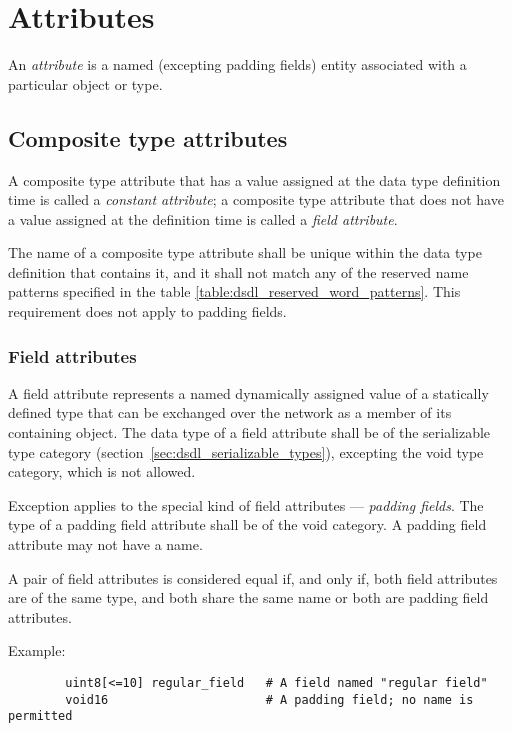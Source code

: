 \section{Attributes}\label{sec:dsdl_attributes}

An \emph{attribute} is a named (excepting padding fields) entity associated with a particular object or type.

\subsection{Composite type attributes}

A composite type attribute that has a value assigned at the data type definition time is called a
\emph{constant attribute};
a composite type attribute that does not have a value assigned at the definition time is called a
\emph{field attribute}.

The name of a composite type attribute shall be unique within the data type definition that contains it,
and it shall not match any of the reserved name patterns specified in the table
\ref{table:dsdl_reserved_word_patterns}.
This requirement does not apply to padding fields.

\subsubsection{Field attributes}

A field attribute represents a named dynamically assigned value of a statically defined type
that can be exchanged over the network as a member of its containing object.
The data type of a field attribute shall be of the serializable type category
(section~\ref{sec:dsdl_serializable_types}),
excepting the void type category, which is not allowed.

Exception applies to the special kind of field attributes --- \emph{padding fields}.
The type of a padding field attribute shall be of the void category.
A padding field attribute may not have a name.

A pair of field attributes is considered equal if, and only if, both field attributes are of the same type,
and both share the same name or both are padding field attributes.

\begin{remark}
    Example:
    \begin{verbatim}
        uint8[<=10] regular_field   # A field named "regular field"
        void16                      # A padding field; no name is permitted
    \end{verbatim}
\end{remark}

